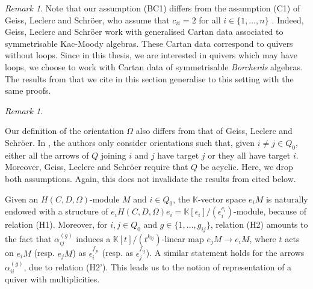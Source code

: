 \documentclass[11pt,english]{article}
\numberwithin{equation}{section}
\numberwithin{figure}{section}
\theoremstyle{definition}
\theoremstyle{plain}
\theoremstyle{remark}
\newtheorem{rmk}[df]{Remark}
\newcommand\KK{\mathbb{K}}
\begin{document}
\begin{rmk}

Note that our assumption (BC1) differs from the assumption (C1) of
Geiss, Leclerc and Schröer, who assume that $c_{ii}=2$ for all $i\in\{1,\ldots,n\}$
\cite[\S 1.4.]{GLS17a}. Indeed, Geiss, Leclerc and Schröer work with
generalised Cartan data associated to symmetrisable Kac-Moody algebras.
These Cartan data correspond to quivers without loops. Since in this
thesis, we are interested in quivers which may have loops, we choose
to work with Cartan data of symmetrisable \textit{Borcherds} algebras.
The results from \cite{GLS17a} that we cite in this section generalise
to this setting with the same proofs.

\end{rmk}

\begin{rmk} \label{Rmk/QuivMulOrient}

Our definition of the orientation $\Omega$ also differs from that
of Geiss, Leclerc and Schröer. In \cite{GLS17a}, the authors only
consider orientations such that, given $i\ne j\in Q_{0}$, either
all the arrows of $Q$ joining $i$ and $j$ have target $j$ or they
all have target $i$. Moreover, Geiss, Leclerc and Schröer require
that $Q$ be acyclic. Here, we drop both assumptions. Again, this
does not invalidate the results from \cite{GLS17a} cited below.

\end{rmk}

Given an $H(C,D,\Omega)$-module $M$ and $i\in Q_{0}$, the $\KK$-vector
space $e_{i}M$ is naturally endowed with a structure of $e_{i}H(C,D,\Omega)e_{i}=\KK[\epsilon_{i}]/(\epsilon_{i}^{c_{i}})$-module,
because of relation (H1). Moreover, for $i,j\in Q_{0}$ and $g\in\{1,\ldots,g_{ij}\}$,
relation (H2) amounts to the fact that $\alpha_{ij}^{(g)}$ induces
a $\KK[t]/(t^{k_{ij}})$-linear map $e_{j}M\rightarrow e_{i}M$, where
$t$ acts on $e_{i}M$ (resp. $e_{j}M$) as $\epsilon_{i}^{f_{ji}}$
(resp. as $\epsilon_{j}^{f_{ij}}$). A similar statement holds for
the arrows $\alpha_{ii}^{(g)}$, due to relation (H2'). This leads
us to the notion of representation of a quiver with multiplicities.
\end{document}
